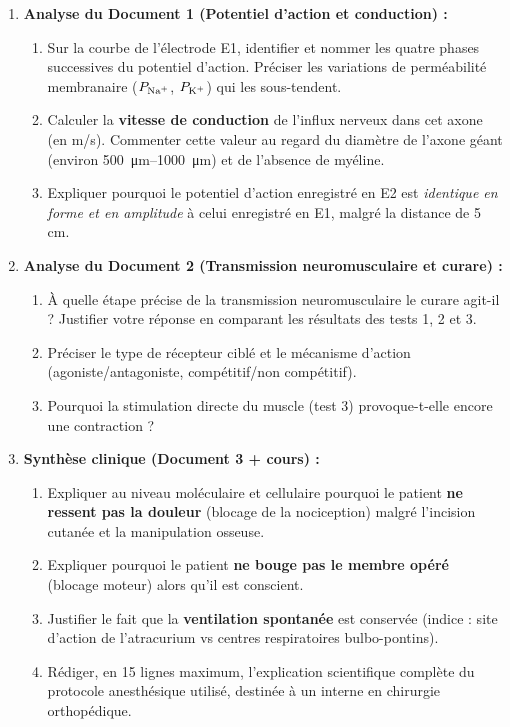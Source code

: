 \documentclass[11pt]{article}
\newcounter{popsec}
\newcounter{popsub}
\newcommand{\courssub}[1]{%
  \stepcounter{popsub}%
  \par\vspace{9pt}\noindent{\popxbold\fontsize{11.5}{13}\selectfont\color{popink}{\color{poporange}\thepopsec.\thepopsub}\hspace{6pt}#1}\par\nopagebreak\vspace{4pt}
}
\begin{document}
\courssub{Consignes}
\begin{exercice}
\begin{enumerate}
\item \textbf{Analyse du Document 1 (Potentiel d'action et conduction) :}
\begin{enumerate}
    \item Sur la courbe de l'électrode E1, identifier et nommer les quatre phases successives du potentiel d'action. Préciser les variations de perméabilité membranaire ($P_{\ce{Na+}}$, $P_{\ce{K+}}$) qui les sous-tendent.
    \item Calculer la \textbf{vitesse de conduction} de l'influx nerveux dans cet axone (en m/s). Commenter cette valeur au regard du diamètre de l'axone géant (environ \SIrange{500}{1000}{\micro\meter}) et de l'absence de myéline.
    \item Expliquer pourquoi le potentiel d'action enregistré en E2 est \emph{identique en forme et en amplitude} à celui enregistré en E1, malgré la distance de 5 cm.
\end{enumerate}

\item \textbf{Analyse du Document 2 (Transmission neuromusculaire et curare) :}
\begin{enumerate}
    \item À quelle étape précise de la transmission neuromusculaire le curare agit-il ? Justifier votre réponse en comparant les résultats des tests 1, 2 et 3.
    \item Préciser le type de récepteur ciblé et le mécanisme d'action (agoniste/antagoniste, compétitif/non compétitif).
    \item Pourquoi la stimulation directe du muscle (test 3) provoque-t-elle encore une contraction ?
\end{enumerate}

\item \textbf{Synthèse clinique (Document 3 + cours) :}
\begin{enumerate}
    \item Expliquer au niveau moléculaire et cellulaire pourquoi le patient \textbf{ne ressent pas la douleur} (blocage de la nociception) malgré l'incision cutanée et la manipulation osseuse.
    \item Expliquer pourquoi le patient \textbf{ne bouge pas le membre opéré} (blocage moteur) alors qu'il est conscient.
    \item Justifier le fait que la \textbf{ventilation spontanée} est conservée (indice : site d'action de l'atracurium vs centres respiratoires bulbo-pontins).
    \item Rédiger, en 15 lignes maximum, l'explication scientifique complète du protocole anesthésique utilisé, destinée à un interne en chirurgie orthopédique.
\end{enumerate}
\end{enumerate}
\end{exercice}
\end{document}
